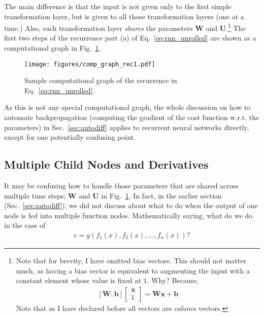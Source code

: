 \documentclass{report}
\newcommand{\vect}[1]{\mathbf{#1}}
\newcommand{\matr}[1]{\mathbf{#1}}
\newcommand{\vb}[0]{\vect{b}}
\newcommand{\vx}[0]{\vect{x}}
\newcommand{\mW}[0]{\matr{W}}
\newcommand{\mU}[0]{\matr{U}}
\begin{document}
The main difference is that the input is not given only to the first simple
transformation layer, but is given to all those transformation layers (one at a
time.) Also, each transformation layer {\em shares} the parameters $\mW$ and
$\mU$.\footnote{
    Note that for brevity, I have omitted bias vectors. This should not matter
    much, as having a bias vector is equivalent to augmenting the input with a
    constant element whose value is fixed at $1$. Why? Because,
    \begin{align*}
        \left[ \mW ; \vb \right]
    \left[ \begin{array}{c} \vx \\1 \end{array} \right]
        = \mW \vx + \vb
    \end{align*}
    Note that as I have declared before all vectors are {\em column} vectors.
} The first two steps of the recurrence part (a) of Eq.~\eqref{eq:rnn_unrolled}
are shown as a computational graph in Fig.~\ref{fig:rec_unrolled}.

\begin{figure}[ht]
    \centering
    \texttt{[image: figures/comp\_graph\_rec1.pdf]}
    \caption{
        Sample computational graph of the recurrence in
        Eq.~\eqref{eq:rnn_unrolled}.
    }
    \label{fig:rec_unrolled}
\end{figure}

As this is not any special computational graph, the whole discussion on how to
automate backpropagation (computing the gradient of the cost function w.r.t. the
parameters) in Sec.~\ref{sec:autodiff} applies to recurrent neural networks
directly, except for one potentially confusing point.

\subsection{Multiple Child Nodes and Derivatives}
\label{sec:rnn_backprop}

It may be confusing how to handle those parameters that are shared across
multiple time steps; $\mW$ and $\mU$ in Fig.~\ref{fig:rec_unrolled}. In fact, in
the earlier section (Sec.~\ref{sec:autodiff}), we did not discuss about what to
do when the output of one node is fed into multiple function nodes.
Mathematically saying, what do we do in the case of 
\begin{align*}
    c = g(f_1(x), f_2(x), \ldots, f_n(x))?
\end{align*}
\end{document}
